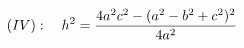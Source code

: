 \documentclass[preview]{standalone}
\begin{document}
\begin{align*}
\special{dvisvgm:raw <g id='unique000'>}(IV):\quad h^2 = \frac{4a^2c^2 - (a^2-b^2+c^2)^2}{4a^2}\special{dvisvgm:raw </g>}
\end{align*}
\end{document}

